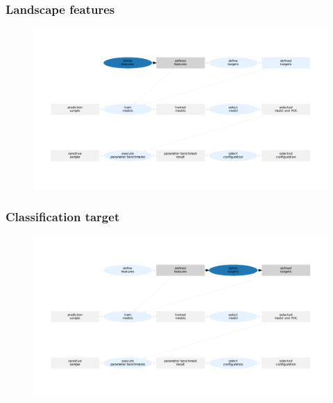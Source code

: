 

\begin{frame}
	\frametitle{Landscape features}
	
	\begin{figure}
		\includegraphics[width=1\textwidth]{figures/flowchart_component_search_0}
	\end{figure}
	
\end{frame}


\begin{frame}
	\frametitle{Classification target}
	
	\begin{figure}
		\includegraphics[width=1\textwidth]{figures/flowchart_component_search_1}
	\end{figure}
	
\end{frame}


